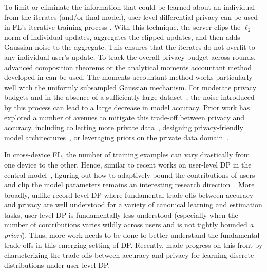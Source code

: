 \documentclass[11pt]{article}
\begin{document}
To limit or eliminate the information that could be learned about an individual from the iterates (and/or final model), user-level differential privacy can be used in FL’s iterative training process \cite{abadi2016deep,mcmahan18dplm,mcmahan2018general,bhowmick2018protection}. With this technique, the server clips the $\ell_2$ norm of individual updates, aggregates the clipped updates, and then adds Gaussian noise to the aggregate. This ensures that the iterates do not overfit to any individual user’s update. To track the overall privacy budget across rounds, advanced composition theorems \cite{DRV10, kairouz2017composition} or the analytical moments accountant method developed in \cite{abadi2016deep,mironov2017renyi, mironov2019r,wang2018subsampled} can be used. The moments accountant method works particularly well with the uniformly subsampled Gaussian mechanism. For moderate privacy budgets and in the absence of a sufficiently large dataset~\cite{ramaswamy2020training}, the noise introduced by this process can lead to a large decrease in model accuracy.  Prior work has explored a number of avenues to mitigate this trade-off between privacy and accuracy, including collecting more private data~\cite{mcmahan18dplm}, designing privacy-friendly model architectures~\cite{papernot2020tempered}, or leveraging priors on the private data domain~\cite{tramer2020differentially}.

In cross-device FL, the number of training examples can vary drastically from one device to the other.
Hence, similar to recent works on user-level DP in the central model~\cite{amin2019bounding}, figuring out how to adaptively bound the contributions of users and clip the model parameters remains an interesting research direction~\cite{thakkar2019differentially, pichapati2019adaclip}. More broadly, unlike record-level DP where fundamental trade-offs between accuracy and privacy are well understood for a variety of canonical learning and estimation tasks, user-level DP is fundamentally less understood (especially when the number of contributions varies wildly across users and is not tightly bounded \textit{a priori}). Thus, more work needs to be done to better understand the fundamental trade-offs in this emerging setting of DP.  Recently, \cite{liu2020learning} made progress on this front by characterizing the trade-offs between accuracy and privacy for learning discrete distributions under user-level DP.
\end{document}

